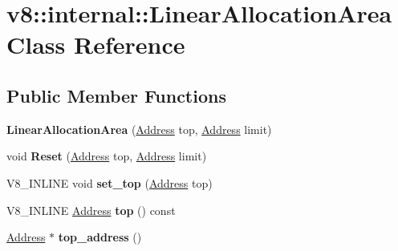 \hypertarget{classv8_1_1internal_1_1LinearAllocationArea}{}\section{v8\+:\+:internal\+:\+:Linear\+Allocation\+Area Class Reference}
\label{classv8_1_1internal_1_1LinearAllocationArea}
\subsection*{Public Member Functions}
\begin{DoxyCompactItemize}
\item 
\mbox{\label{classv8_1_1internal_1_1LinearAllocationArea_afa4544b2394504f46380297c1679df25}} 
{\bfseries Linear\+Allocation\+Area} (\mbox{\hyperlink{classuintptr__t}{Address}} top, \mbox{\hyperlink{classuintptr__t}{Address}} limit)
\item 
\mbox{\label{classv8_1_1internal_1_1LinearAllocationArea_a3a6048218cb093a80889a849ad62655d}} 
void {\bfseries Reset} (\mbox{\hyperlink{classuintptr__t}{Address}} top, \mbox{\hyperlink{classuintptr__t}{Address}} limit)
\item 
\mbox{\label{classv8_1_1internal_1_1LinearAllocationArea_a202f82d95cc693420a2fa6a69981cf55}} 
V8\+\_\+\+I\+N\+L\+I\+NE void {\bfseries set\+\_\+top} (\mbox{\hyperlink{classuintptr__t}{Address}} top)
\item 
\mbox{\label{classv8_1_1internal_1_1LinearAllocationArea_af4ca520b139834b4719e7241eb8de346}} 
V8\+\_\+\+I\+N\+L\+I\+NE \mbox{\hyperlink{classuintptr__t}{Address}} {\bfseries top} () const
\item 
\mbox{\label{classv8_1_1internal_1_1LinearAllocationArea_a0db768f308efcdcc978140c4a697f071}} 
\mbox{\hyperlink{classuintptr__t}{Address}} $\ast$ {\bfseries top\+\_\+address} ()
\item 
\mbox{\label{classv8_1_1internal_1_1LinearAllocationArea_a339c0848acd979fd2f47867eab1b27fe}} 

\end{DoxyCompactItemize}
